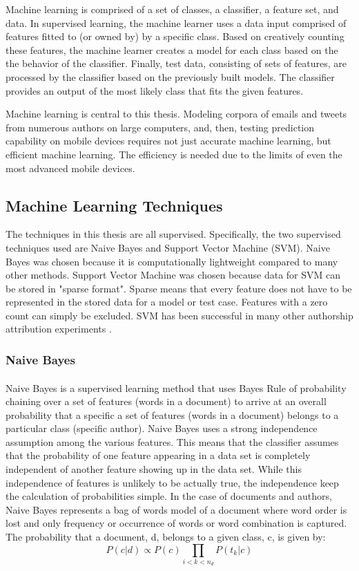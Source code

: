Machine learning is comprised of a set of classes, a classifier, a feature set, and data.  In supervised learning, the machine learner uses a data input comprised of features fitted to (or owned by) by a specific class.  Based on creatively counting these features, the machine learner creates a model for each class based on the the behavior of the classifier.  Finally, test data, consisting of sets of features, are processed by the classifier based on the previously built models.  The classifier provides an output of the most likely class that fits the given features.

Machine learning is central to this thesis.  Modeling corpora of emails and tweets from numerous authors on large computers, and, then, testing prediction capability on mobile devices requires not just accurate machine learning, but efficient machine learning.  The efficiency is needed due to the limits of even the most advanced mobile devices.

	\subsection {Machine Learning Techniques}
	The techniques in this thesis are all supervised.  Specifically, the two supervised techniques used are Naive Bayes and Support Vector Machine (SVM).  Naive Bayes was chosen because it is computationally lightweight compared to many other methods.  Support Vector Machine was chosen because data for SVM can be stored in "sparse format".  Sparse means that every feature does not have to be represented in the stored data for a model or test case.  Features with a zero count can simply be excluded.  SVM has been successful in many other authorship attribution experiments \cite{jurafsky_speech_2009}.

		\subsubsection{Naive Bayes}
			\paragraph{} Naive Bayes is a supervised learning method that uses Bayes Rule of probability chaining over a set of features (words in a document) to arrive at an overall probability that a specific a set of features (words in a document) belongs to a particular class (specific author). Naive Bayes uses a strong independence assumption among the various features.  This means that the classifier assumes that the probability of one feature appearing in a data set is completely independent of another feature showing up in the data set.  While this independence of features is unlikely to be actually true, the independence keep the calculation of probabilities simple.  In the case of documents and authors, Naive Bayes represents a bag of words model of a document where word order is lost and only frequency or occurrence of words or word combination is captured. The probability that a document, d, belongs to a given class, c, is given by:
				\begin{equation} P(c|d) \propto P(c) \prod_{i<k<n_d} P(t_k|c) \end{equation}

